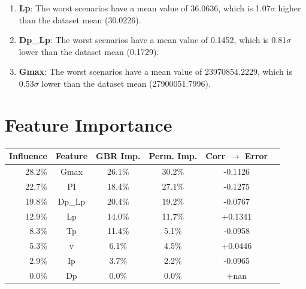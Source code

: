 \documentclass[11pt,a4paper]{article}
\begin{document}
\begin{enumerate}
\item \textbf{Lp}: The worst scenarios have a mean value of 36.0636, which is 1.07$\sigma$ higher than the dataset mean (30.0226).
\item \textbf{Dp_Lp}: The worst scenarios have a mean value of 0.1452, which is 0.81$\sigma$ lower than the dataset mean (0.1729).
\item \textbf{Gmax}: The worst scenarios have a mean value of 23970854.2229, which is 0.53$\sigma$ lower than the dataset mean (27900051.7996).
\end{enumerate}

\section{Feature Importance}
\begin{table}[h]
\centering
\begin{tabular}{rccccc}
\toprule
\textbf{Influence} & \textbf{Feature} & \textbf{GBR Imp.} & \textbf{Perm. Imp.} & \textbf{Corr $\to$ Error} \\
\midrule
    28.2\% & Gmax & 26.1\% & 30.2\% & -0.1126 \\
    22.7\% & PI & 18.4\% & 27.1\% & -0.1275 \\
    19.8\% & Dp_Lp & 20.4\% & 19.2\% & -0.0767 \\
    12.9\% & Lp & 14.0\% & 11.7\% & +0.1341 \\
    8.3\% & Tp & 11.4\% & 5.1\% & -0.0958 \\
    5.3\% & v & 6.1\% & 4.5\% & +0.0446 \\
    2.9\% & Ip & 3.7\% & 2.2\% & -0.0965 \\
    0.0\% & Dp & 0.0\% & 0.0\% & +nan \\
\bottomrule
\end{tabular}
\end{table}
\end{document}
